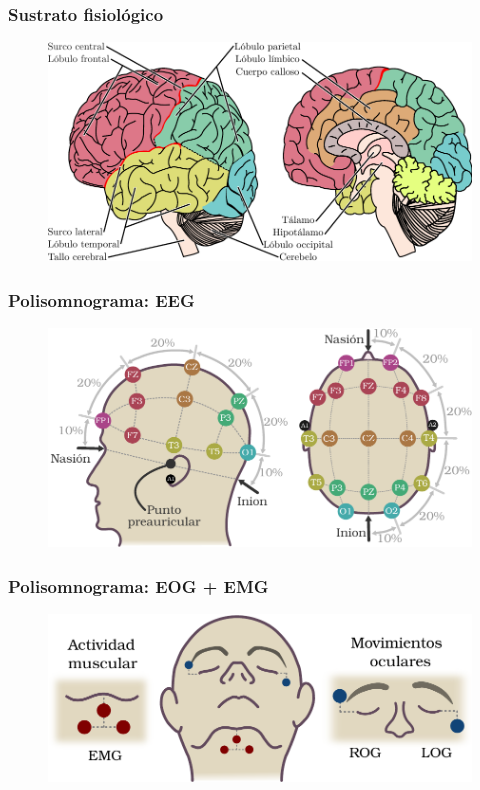 \documentclass[serif,mathserif,professionalfont]{beamer}
\begin{document}
\begin{frame}\frametitle{Sustrato fisiológico}
\begin{figure}
\centering
\includegraphics[width=0.9\linewidth]{./img_diagramas/cerebro_zonas_limpio.pdf} 
\end{figure}
\end{frame}

\begin{frame}\frametitle{Polisomnograma: EEG}
\begin{figure}
\centering
\includegraphics[width=0.9\linewidth]{./img_diagramas/cabeza_proporcionada_color_v2.pdf} 
\end{figure}
\end{frame}

\begin{frame}\frametitle{Polisomnograma: EOG + EMG}
\begin{figure}
\centering
\includegraphics[width=0.9\linewidth]{./img_diagramas/emg_eog_v3.pdf} 
\end{figure}
\end{frame}
\end{document}
